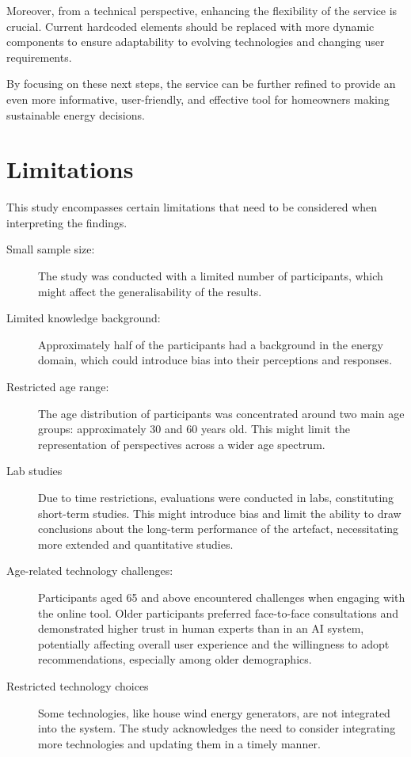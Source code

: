 Moreover, from a technical perspective, enhancing the flexibility of the service is crucial. 
Current hardcoded elements should be replaced with more dynamic components to ensure adaptability to evolving technologies and changing user requirements. 

By focusing on these next steps, the service can be further refined to provide an even more informative, user-friendly, and effective tool for homeowners making sustainable energy decisions.


\section{Limitations}

This study encompasses certain limitations that need to be considered when interpreting the findings.
\begin{description}
    \item[Small sample size:] The study was conducted with a limited number of participants, which might affect the generalisability of the results.
    \item[Limited knowledge background:] Approximately half of the participants had a background in the energy domain, which could introduce bias into their perceptions and responses.
    \item[Restricted age range:] The age distribution of participants was concentrated around two main age groups: approximately 30 and 60 years old. This might limit the representation of perspectives across a wider age spectrum.
    \item[Lab studies] Due to time restrictions, evaluations were conducted in labs, constituting short-term studies. This might introduce bias and limit the ability to draw conclusions about the long-term performance of the artefact, necessitating more extended and quantitative studies.
    \item[Age-related technology challenges:] Participants aged 65 and above encountered challenges when engaging with the online tool. Older participants preferred face-to-face consultations and demonstrated higher trust in human experts than in an AI system, potentially affecting overall user experience and the willingness to adopt recommendations, especially among older demographics.
    \item[Restricted technology choices] Some technologies, like house wind energy generators, are not integrated into the system. The study acknowledges the need to consider integrating more technologies and updating them in a timely manner.

\end{description}
